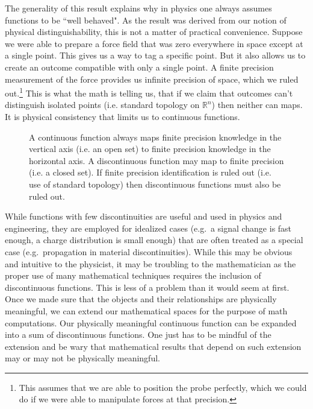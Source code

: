 \documentclass[smallextended]{svjour3}
\numberwithin{equation}{section}
\theoremstyle{definition}
\begin{document}
The generality of this result explains why in physics one always assumes functions to be ``well behaved". As the result was derived from our notion of physical distinguishability, this is not a matter of practical convenience. Suppose we were able to prepare a force field that was zero everywhere in space except at a single point. This gives us a way to tag a specific point. But it also allows us to create an outcome compatible with only a single point. A finite precision measurement of the force provides us infinite precision of space, which we ruled out.\footnote{This assumes that we are able to position the probe perfectly, which we could do if we were able to manipulate forces at that precision.} This is what the math is telling us, that if we claim that outcomes can't distinguish isolated points (i.e. standard topology on $\mathbb{R}^n$) then neither can maps. It is physical consistency that limits us to continuous functions.

\begin{figure}
	
	\caption{A continuous function always maps finite precision knowledge in the vertical axis (i.e. an open set) to finite precision knowledge in the horizontal axis. A discontinuous function may map to finite precision (i.e. a closed set). If finite precision identification is ruled out (i.e. use of standard topology) then discontinuous functions must also be ruled out.}
	\label{fig:continuity}
\end{figure}

While functions with few discontinuities are useful and used in physics and engineering, they are employed for idealized cases  (e.g.~a signal change is fast enough, a charge distribution is small enough) that are often treated as a special case (e.g.~propagation in material discontinuities). While this may be obvious and intuitive to the physicist, it may be troubling to the mathematician as the proper use of many mathematical techniques requires the inclusion of discontinuous functions. This is less of a problem than it would seem at first. Once we made sure that the objects and their relationships are physically meaningful, we can extend our mathematical spaces for the purpose of math computations. Our physically meaningful continuous function can be expanded into a sum of discontinuous functions. One just has to be mindful of the extension and be wary that mathematical results that depend on such extension may or may not be physically meaningful.
\end{document}
